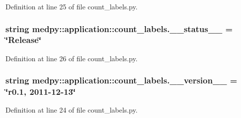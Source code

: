 Definition at line 25 of file count\_\-labels.py.

\hypertarget{namespacemedpy_1_1application_1_1count__labels_adcf28b65bcd5edac3155837669fd1708}{
\subsubsection[{\_\-\_\-status\_\-\_\-}]{\setlength{\rightskip}{0pt plus 5cm}string {\bf medpy::application::count\_\-labels.\_\-\_\-status\_\-\_\-} = \char`\"{}Release\char`\"{}}}
\label{namespacemedpy_1_1application_1_1count__labels_adcf28b65bcd5edac3155837669fd1708}


Definition at line 26 of file count\_\-labels.py.

\hypertarget{namespacemedpy_1_1application_1_1count__labels_a09bc492b1090d02ee2fc62870d49b0f2}{
\subsubsection[{\_\-\_\-version\_\-\_\-}]{\setlength{\rightskip}{0pt plus 5cm}string {\bf medpy::application::count\_\-labels.\_\-\_\-version\_\-\_\-} = \char`\"{}r0.1, 2011-\/12-\/13\char`\"{}}}
\label{namespacemedpy_1_1application_1_1count__labels_a09bc492b1090d02ee2fc62870d49b0f2}


Definition at line 24 of file count\_\-labels.py.

